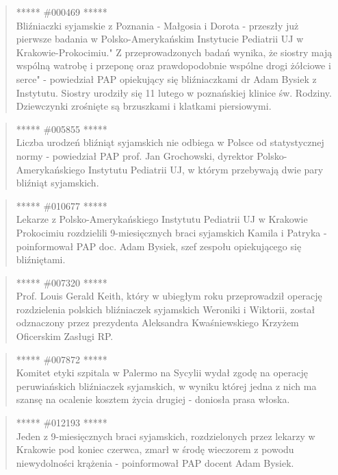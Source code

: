 \documentclass[11pt,a4paper]{article}
\begin{document}
\begin{quote} ***** \#000469 *****\\ Bliźniaczki syjamskie z Poznania - Małgosia i
Dorota - przeszły już pierwsze badania w Polsko-Amerykańskim Instytucie
Pediatrii UJ w Krakowie-Prokocimiu." Z przeprowadzonych badań wynika, że
siostry mają wspólną watrobę i przeponę oraz prawdopodobnie wspólne drogi
żółciowe i serce" - powiedział PAP opiekujący się bliźniaczkami dr Adam Bysiek
z Instytutu. Siostry urodziły się 11 lutego w poznańskiej klinice św. Rodziny.
Dziewczynki zrośnięte są brzuszkami i klatkami piersiowymi.  \end{quote}

\begin{quote} ***** \#005855 *****\\ Liczba urodzeń bliźniąt syjamskich nie
odbiega w Polsce od statystycznej normy - powiedział PAP prof. Jan Grochowski,
dyrektor Polsko-Amerykańskiego Instytutu Pediatrii UJ, w którym przebywają dwie
pary bliźniąt syjamskich.  \end{quote}

\begin{quote} ***** \#010677 *****\\ Lekarze z Polsko-Amerykańskiego Instytutu
Pediatrii UJ w Krakowie Prokocimiu rozdzielili 9-miesięcznych braci syjamskich
Kamila i Patryka - poinformował PAP doc. Adam Bysiek, szef zespołu opiekującego
się bliźniętami.  \end{quote}

\begin{quote} ***** \#007320 *****\\ Prof. Louis Gerald Keith, który w ubiegłym
roku przeprowadził operację rozdzielenia polskich bliźniaczek syjamskich
Weroniki i Wiktorii, został odznaczony przez prezydenta Aleksandra
Kwaśniewskiego Krzyżem Oficerskim Zasługi RP.  \end{quote}

\begin{quote} ***** \#007872 *****\\ Komitet etyki szpitala w Palermo na Sycylii
wydał zgodę na operację peruwiańskich bliźniaczek syjamskich, w wyniku której
jedna z nich ma szansę na ocalenie kosztem życia drugiej - doniosła prasa
włoska.  \end{quote}

\begin{quote} ***** \#012193 *****\\ Jeden z 9-miesięcznych braci syjamskich,
rozdzielonych przez lekarzy w Krakowie pod koniec czerwca, zmarł w środę
wieczorem z powodu niewydolności krążenia - poinformował PAP docent Adam
Bysiek.  \end{quote}
\end{document}
